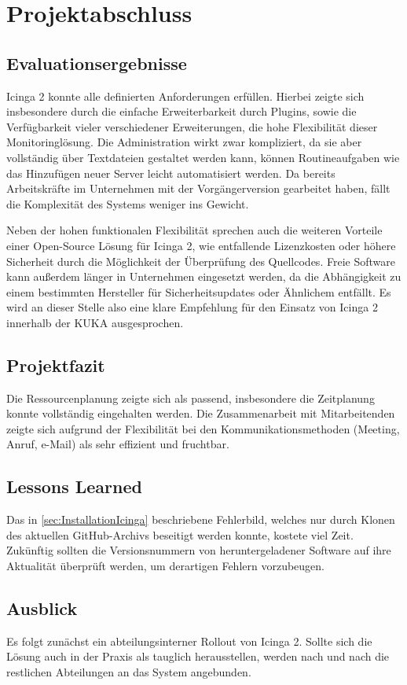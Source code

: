 \section{Projektabschluss} 
\label{sec:projektabschluss}

\subsection{Evaluationsergebnisse}
\label{sec:Evaluationsergebnisse}
\glqq{}Icinga 2\grqq{} konnte alle definierten Anforderungen erfüllen. Hierbei zeigte sich insbesondere durch die einfache Erweiterbarkeit durch Plugins, sowie die Verfügbarkeit vieler verschiedener Erweiterungen, die hohe Flexibilität dieser Monitoringlösung. Die Administration wirkt zwar kompliziert, da sie aber vollständig über Textdateien gestaltet werden kann, können Routineaufgaben wie das Hinzufügen neuer Server leicht automatisiert werden. Da bereits Arbeitskräfte im Unternehmen mit der Vorgängerversion gearbeitet haben, fällt die Komplexität des Systems weniger ins Gewicht.

Neben der hohen funktionalen Flexibilität sprechen auch die weiteren Vorteile einer Open-Source Lösung für \glqq{}Icinga 2\grqq{}, wie entfallende Lizenzkosten oder höhere Sicherheit durch die Möglichkeit der Überprüfung des Quellcodes. Freie Software kann außerdem länger in Unternehmen eingesetzt werden, da die Abhängigkeit zu einem bestimmten Hersteller für Sicherheitsupdates oder Ähnlichem entfällt. Es wird an dieser Stelle also eine klare Empfehlung für den Einsatz von \grqq{}Icinga 2\grqq{} innerhalb der KUKA ausgesprochen.

\subsection{Projektfazit}
\label{sec:Projektfazit}
Die Ressourcenplanung zeigte sich als passend, insbesondere die Zeitplanung konnte vollständig eingehalten werden. Die Zusammenarbeit mit Mitarbeitenden zeigte sich aufgrund der Flexibilität bei den Kommunikationsmethoden (Meeting, Anruf, e-Mail) als sehr effizient und fruchtbar.

\subsection{Lessons Learned}
\label{sec:LessonsLearned}
Das in \ref{sec:InstallationIcinga}  beschriebene Fehlerbild, welches nur durch Klonen des aktuellen GitHub-Archivs beseitigt werden konnte, kostete viel Zeit. Zukünftig sollten die Versionsnummern von heruntergeladener Software auf ihre Aktualität überprüft werden, um derartigen Fehlern vorzubeugen.

\subsection{Ausblick}
\label{sec:Ausblick}
Es folgt zunächst ein abteilungsinterner Rollout von \glqq{}Icinga 2\grqq{}. Sollte sich die Lösung auch in der Praxis als tauglich herausstellen, werden nach und nach die restlichen Abteilungen an das System angebunden.